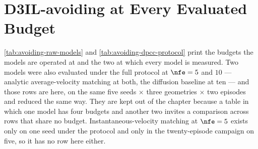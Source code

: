 
\section{D3IL-avoiding at Every Evaluated Budget}\label{app:avoiding-budgets}

\autoref{tab:avoiding-raw-models} and \autoref{tab:avoiding-dpcc-protocol} print the budgets the models
are operated at and the two at which every model is measured. Two models were also evaluated under the
full protocol at $\nfe=5$ and $10$ --- analytic average-velocity matching at both, the diffusion baseline
at ten --- and those rows are here, on the same five seeds $\times$ three geometries $\times$ two episodes
and reduced the same way. They are kept out of the chapter because a table in which one model has four
budgets and another two invites a comparison across rows that share no budget. Instantaneous-velocity
matching at $\nfe=5$ exists only on one seed under the protocol and only in the twenty-episode campaign
on five, so it has no row here either.

